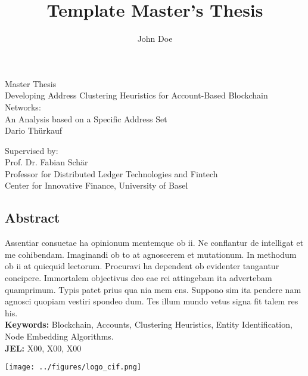 \documentclass[12pt,a4paper,titlepage,oneside,english]{article}
\title{Template Master's Thesis}
\author{John Doe}
\begin{document}
\begin{center}
\vspace{1em}
\large{Master Thesis}\\
\huge Developing Address Clustering Heuristics for Account-Based Blockchain Networks:\\ An Analysis based on a Specific Address Set \\
\Large \vspace{1em}
Dario Thürkauf
\end{center}

\vspace{1em}
\normalsize
\begin{flushleft}
Supervised by:\\ 
Prof. Dr. Fabian Schär \\ 
Professor for Distributed Ledger Technologies and Fintech \\
Center for Innovative Finance, University of Basel
\end{flushleft}

\vspace{1em}
\onehalfspacing
\begin{center}
\section*{Abstract}
\end{center}
Assentiar consuetae ha opinionum mentemque ob ii. Ne conflantur de intelligat et me cohibendam. Imaginandi ob to at agnoscerem et mutationum. In methodum ob ii at quicquid lectorum. Procuravi ha dependent ob evidenter tangantur concipere. Immortalem objectivus deo eae rei attingebam ita advertebam quamprimum. Typis patet prius qua nia mem ens. Suppono sim ita pendere nam agnosci quopiam vestiri spondeo dum. Tes illum mundo vetus signa fit talem res his.  \\
\vfill
\textbf{Keywords:} Blockchain, Accounts, Clustering Heuristics, Entity Identification, Node Embedding Algorithms.\\
\noindent\textbf{JEL:} X00, X00, X00




\newpage
{}
\tableofcontents

\vfill
\begin{center}
\texttt{[image: ../figures/logo\_cif.png]}
\end{center}
\newpage
\singlespacing
\end{document}
